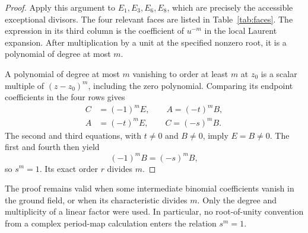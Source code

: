 \begin{proof}
Apply this argument to \(E_1,E_3,E_6,E_8\), which are precisely
the accessible exceptional divisors. The four relevant faces are
listed in Table~\ref{tab:faces}. The expression in its third column
is the coefficient of \(u^{-m}\) in the local Laurent expansion.
After multiplication by a unit at the specified nonzero root, it is
a polynomial of degree at most \(m\).



A polynomial of degree at most \(m\) vanishing to order at least
\(m\) at \(z_0\) is a scalar multiple of \((z-z_0)^m\),
including the zero polynomial. Comparing its endpoint coefficients
in the four rows gives
\begin{equation}\label{eq:face-relations}
\begin{split}
C&=(-1)^mE,\qquad A=(-t)^mB,\\
A&=(-t)^mE,\qquad C=(-s)^mB.
\end{split}
\end{equation}
The second and third equations, with \(t\ne0\) and \(B\ne0\),
imply \(E=B\ne0\). The first and fourth then yield
\[
(-1)^mB=(-s)^mB,
\]
so \(s^m=1\). Its exact order \(r\) divides \(m\).
\end{proof}

The proof remains valid when some intermediate binomial coefficients
vanish in the ground field, or when its characteristic divides
\(m\). Only the degree and multiplicity of a linear factor were
used. In particular, no root-of-unity convention from a complex
period-map calculation enters the relation \(s^m=1\).
